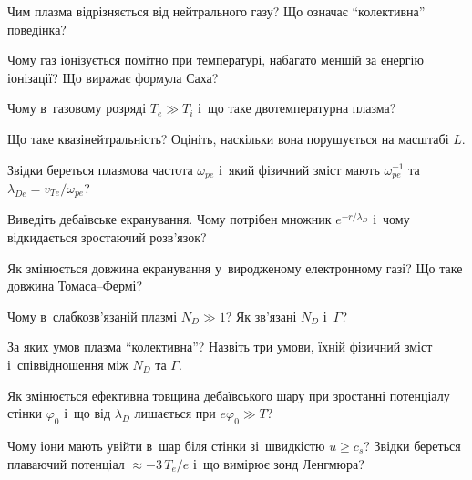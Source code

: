 \begin{Questions}
\begin{quizlist}
\item Чим плазма відрізняється від нейтрального газу? Що означає
		  \enquote{колективна} поведінка?

\item Чому газ іонізується помітно при температурі, набагато меншій за енергію
		  іонізації? Що виражає формула Саха?

\item Чому в~газовому розряді $T_e\gg T_i$ і~що таке двотемпературна плазма?

\item Що таке квазінейтральність? Оцініть, наскільки вона порушується на масштабі
		  $L$.

\item Звідки береться плазмова частота $\omega_{pe}$ і~який фізичний зміст мають $\omega_{pe}^{-1}$ та~$\lambda_{De}=v_{Te}/\omega_{pe}$?

\item Виведіть дебаївське екранування. Чому потрібен множник $e^{-r/\lambda_D}$
		  і~чому відкидається зростаючий розв'язок?

\item Як змінюється довжина екранування у~виродженому електронному газі? Що таке
		  довжина Томаса--Фермі?

\item Чому в~слабкозв'язаній плазмі $N_D\gg1$? Як зв'язані $N_D$ і~$\Gamma$?

\item За яких умов плазма \enquote{колективна}? Назвіть три умови, їхній фізичний зміст і~співвідношення
		  між $N_D$ та $\Gamma$.

\item Як змінюється ефективна товщина дебаївського шару при зростанні потенціалу
		  стінки $\varphi_0$ і~що від $\lambda_D$ лишається при $e\varphi_0\gg T$?

\item Чому іони мають увійти в~шар біля стінки зі~швидкістю $u\ge c_s$? Звідки береться плаваючий
		  потенціал $\approx-3\,T_e/e$ і~що вимірює зонд Ленгмюра?

\end{quizlist}
\end{Questions}

